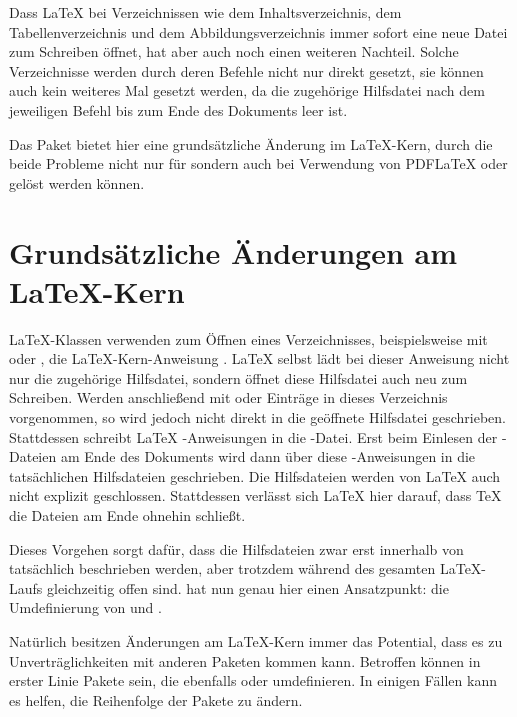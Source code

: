 Dass \LaTeX{} bei Verzeichnissen wie dem Inhaltsverzeichnis, dem
Tabellenverzeichnis und dem Abbildungsverzeichnis immer sofort eine neue Datei
zum Schreiben öffnet, hat aber auch noch einen weiteren Nachteil. Solche
Verzeichnisse werden durch deren Befehle nicht nur direkt gesetzt, sie können
auch kein weiteres Mal gesetzt werden, da die zugehörige Hilfsdatei nach dem
jeweiligen Befehl bis zum Ende des Dokuments leer ist.

Das Paket  bietet hier eine grundsätzliche Änderung im
\LaTeX-Kern, durch die beide Probleme nicht nur für \LuaLaTeX{} sondern auch
bei Verwendung von PDF\LaTeX{} oder \XeLaTeX{} gelöst werden können.


\section{Grundsätzliche Änderungen am \LaTeX-Kern}

\LaTeX-Klassen verwenden zum Öffnen eines Verzeichnisses, beispielsweise mit
 oder , die \LaTeX-Kern-Anweisung
. \LaTeX{} selbst lädt bei dieser
Anweisung nicht nur die zugehörige Hilfsdatei, sondern öffnet diese Hilfsdatei
auch neu zum Schreiben. Werden anschließend mit  oder
 Einträge in dieses Verzeichnis vorgenommen, so wird
jedoch nicht direkt in die geöffnete Hilfsdatei geschrieben. Stattdessen
schreibt \LaTeX{} -Anweisungen in die
-Datei. Erst beim Einlesen der -Dateien am Ende des
Dokuments wird dann über diese -Anweisungen in die
tatsächlichen Hilfsdateien geschrieben. Die Hilfsdateien werden von \LaTeX{}
auch nicht explizit geschlossen. Stattdessen verlässt sich \LaTeX{} hier
darauf, dass \TeX{} die Dateien am Ende ohnehin schließt.

Dieses Vorgehen sorgt dafür, dass die Hilfsdateien zwar erst innerhalb von
 tatsächlich beschrieben werden, aber trotzdem
während des gesamten \LaTeX-Laufs gleichzeitig offen sind. 
hat nun genau hier einen Ansatzpunkt: die Umdefinierung von 
und .

Natürlich besitzen Änderungen am \LaTeX-Kern immer das
Potential, dass es zu Unverträglichkeiten mit anderen Paketen kommen
kann. Betroffen können in erster Linie Pakete sein, die ebenfalls
 oder  umdefinieren. In einigen Fällen kann
es helfen, die Reihenfolge der Pakete zu ändern.%
\iffalse %
\ Wenn Sie auf ein solches Problem stoßen, sollten Sie sich an den
\KOMAScript-Autor wenden.5
\fi

